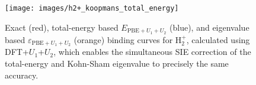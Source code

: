 \begin{figure}[th!]
\centering
\texttt{[image: images/h2+\_koopmans\_total\_energy]}
\caption[Total-energy and eigenvalue binding curves for H$_2^+$ calculated with generalised DFT+$U$ functional]{
Exact (red),
total-energy based $E_{\textrm{PBE}+U_1+U_2}$ (blue), 
and eigenvalue based $\varepsilon_{\textrm{PBE}+U_1+U_2}$ (orange)
binding curves for H$_2^+$, calculated
using DFT+$U_1$+$U_2$, 
which enables the simultaneous  
SIE correction of the total-energy and Kohn-Sham eigenvalue 
to precisely the same accuracy.}
\label{fig:h2+_koopmans_total_energy}
\end{figure}



%
%
%


